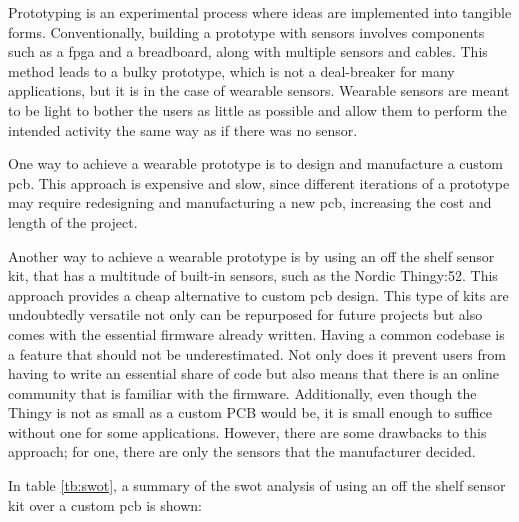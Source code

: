 Prototyping is an experimental process where ideas are implemented into tangible forms. Conventionally, building a prototype with sensors involves components such as a \gls{fpga} and a breadboard, along with multiple sensors and cables. This method leads to a bulky prototype, which is not a deal-breaker for many applications, but it is in the case of wearable sensors. Wearable sensors are meant to be light to bother the users as little as possible and allow them to perform the intended activity the same way as if there was no sensor.

One way to achieve a wearable prototype is to design and manufacture a custom \gls{pcb}. This approach is expensive and slow, since different iterations of a prototype may require redesigning and manufacturing a new \gls{pcb}, increasing the cost and length of the project. 

Another way to achieve a wearable prototype is by using an off the shelf sensor kit, that has a multitude of built-in sensors, such as the Nordic Thingy:52. This approach provides a cheap alternative to custom \gls{pcb} design. This type of kits are undoubtedly versatile not only can be repurposed for future projects but also comes with the essential firmware already written. Having a common codebase is a feature that should not be underestimated. Not only does it prevent users from having to write an essential share of code but also means that there is an online community that is familiar with the firmware.
 Additionally, even though the Thingy is not as small as a custom PCB would be, it is small enough to suffice without one for some applications. However, there are some drawbacks to this approach; for one, there are only the sensors that the manufacturer decided.

In table \ref{tb:swot}, a summary of the \gls{swot} analysis of using an off the shelf sensor kit over a custom \gls{pcb} is shown:

